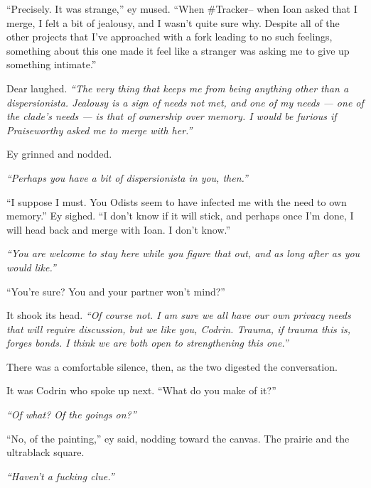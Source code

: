 ``Precisely. It was strange,'' ey mused. ``When \#Tracker-- when Ioan asked that I merge, I felt a bit of jealousy, and I wasn't quite sure why. Despite all of the other projects that I've approached with a fork leading to no such feelings, something about this one made it feel like a stranger was asking me to give up something intimate.''

Dear laughed. \emph{``The very thing that keeps me from being anything other than a dispersionista. Jealousy is a sign of needs not met, and one of my needs — one of the clade's needs — is that of ownership over memory. I would be furious if Praiseworthy asked me to merge with her.''}

Ey grinned and nodded.

\emph{``Perhaps you have a bit of dispersionista in you, then.''}

``I suppose I must. You Odists seem to have infected me with the need to own memory.'' Ey sighed. ``I don't know if it will stick, and perhaps once I'm done, I will head back and merge with Ioan. I don't know.''

\emph{``You are welcome to stay here while you figure that out, and as long after as you would like.''}

``You're sure? You and your partner won't mind?''

It shook its head. \emph{``Of course not. I am sure we all have our own privacy needs that will require discussion, but we like you, Codrin. Trauma, if trauma this is, forges bonds. I think we are both open to strengthening this one.''}

There was a comfortable silence, then, as the two digested the conversation.

It was Codrin who spoke up next. ``What do you make of it?''

\emph{``Of what? Of the goings on?''}

``No, of the painting,'' ey said, nodding toward the canvas. The prairie and the ultrablack square.

\emph{``Haven't a fucking clue.''}
